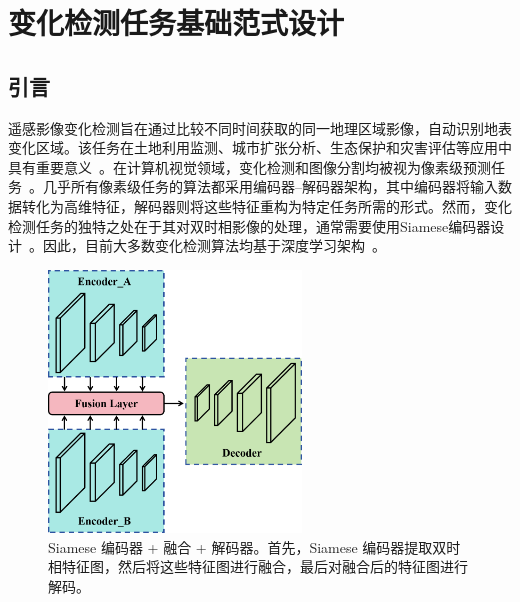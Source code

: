 
\chapter{变化检测任务基础范式设计}

\section{引言}
遥感影像变化检测旨在通过比较不同时间获取的同一地理区域影像，自动识别地表变化区域。该任务在土地利用监测、城市扩张分析、生态保护和灾害评估等应用中具有重要意义~\cite{ting_bai_deep_2023}。在计算机视觉领域，变化检测和图像分割均被视为像素级预测任务~\cite{YGXB202309001}。几乎所有像素级任务的算法都采用编码器–解码器架构，其中编码器将输入数据转化为高维特征，解码器则将这些特征重构为特定任务所需的形式。然而，变化检测任务的独特之处在于其对双时相影像的处理，通常需要使用Siamese编码器设计~\cite{dong_efficientcd_2024}。因此，目前大多数变化检测算法均基于深度学习架构~\cite{chen_remote_2022, zhang_swinsunet_2022, wang2022unetformer}。


\begin{figure}[!htbp]
  \centering
  \includegraphics[width=0.6\textwidth]{paper_figures/变化检测任务基础范式设计/SEED1a.png}
  \caption{Siamese 编码器 + 融合 + 解码器。首先，Siamese 编码器提取双时相特征图，然后将这些特征图进行融合，最后对融合后的特征图进行解码。}
  \label{fig:SEED1a}
\end{figure}

